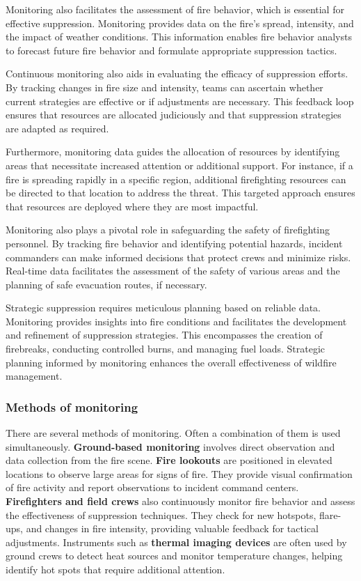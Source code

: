 \documentclass[
  12 pt,
]{Nemilov}
\begin{document}
Monitoring also facilitates the assessment of fire behavior, which is essential for effective suppression. Monitoring provides data on the fire's spread, intensity, and the impact of weather conditions. This information enables fire behavior analysts to forecast future fire behavior and formulate appropriate suppression tactics.

Continuous monitoring also aids in evaluating the efficacy of suppression efforts. By tracking changes in fire size and intensity, teams can ascertain whether current strategies are effective or if adjustments are necessary. This feedback loop ensures that resources are allocated judiciously and that suppression strategies are adapted as required.

Furthermore, monitoring data guides the allocation of resources by identifying areas that necessitate increased attention or additional support. For instance, if a fire is spreading rapidly in a specific region, additional firefighting resources can be directed to that location to address the threat. This targeted approach ensures that resources are deployed where they are most impactful.

Monitoring also plays a pivotal role in safeguarding the safety of firefighting personnel. By tracking fire behavior and identifying potential hazards, incident commanders can make informed decisions that protect crews and minimize risks. Real-time data facilitates the assessment of the safety of various areas and the planning of safe evacuation routes, if necessary.

Strategic suppression requires meticulous planning based on reliable data. Monitoring provides insights into fire conditions and facilitates the development and refinement of suppression strategies. This encompasses the creation of firebreaks, conducting controlled burns, and managing fuel loads. Strategic planning informed by monitoring enhances the overall effectiveness of wildfire management.

\subsubsection{Methods of monitoring}\label{methods-of-monitoring}

There are several methods of monitoring. Often a combination of them is used simultaneously. \textbf{Ground-based monitoring} involves direct observation and data collection from the fire scene. \textbf{Fire lookouts} are positioned in elevated locations to observe large areas for signs of fire. They provide visual confirmation of fire activity and report observations to incident command centers. \textbf{Firefighters and field crews} also continuously monitor fire behavior and assess the effectiveness of suppression techniques. They check for new hotspots, flare-ups, and changes in fire intensity, providing valuable feedback for tactical adjustments. Instruments such as \textbf{thermal imaging devices} are often used by ground crews to detect heat sources and monitor temperature changes, helping identify hot spots that require additional attention.
\end{document}
